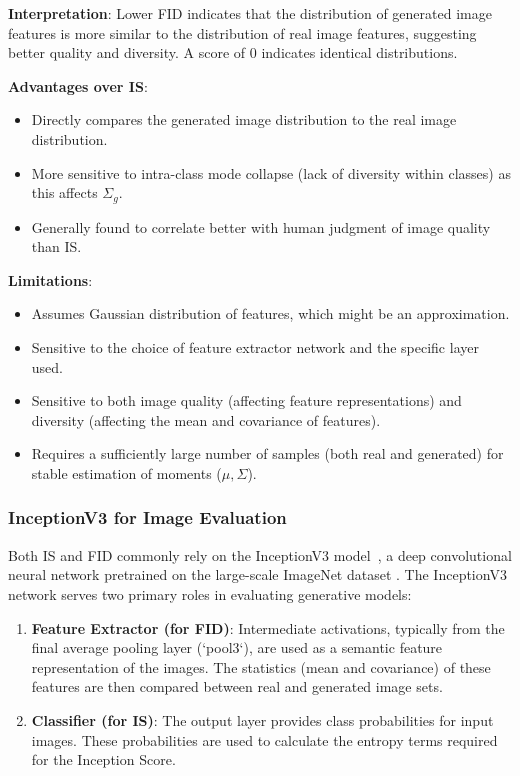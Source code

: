 \noindent\textbf{Interpretation}:
Lower FID indicates that the distribution of generated image features is more similar to the distribution of real image features, suggesting better quality and diversity. A score of 0 indicates identical distributions.

\noindent\textbf{Advantages over IS}:
\begin{itemize}
    \item Directly compares the generated image distribution to the real image distribution.
    \item More sensitive to intra-class mode collapse (lack of diversity within classes) as this affects \(\Sigma_g\).
    \item Generally found to correlate better with human judgment of image quality than IS.
\end{itemize}

\noindent\textbf{Limitations}:
\begin{itemize}
    \item Assumes Gaussian distribution of features, which might be an approximation.
    \item Sensitive to the choice of feature extractor network and the specific layer used.
    \item Sensitive to both image quality (affecting feature representations) and diversity (affecting the mean and covariance of features).
    \item Requires a sufficiently large number of samples (both real and generated) for stable estimation of moments (\(\mu, \Sigma\)).
\end{itemize}

\subsubsection[InceptionV3 Model]{InceptionV3 for Image Evaluation}

Both IS and FID commonly rely on the InceptionV3 model~\cite{szegedy2016rethinking}, a deep convolutional neural network pretrained on the large-scale ImageNet dataset \cite{ImageNetDataset5206848}. The InceptionV3 network serves two primary roles in evaluating generative models:

\begin{enumerate}
    \item \textbf{Feature Extractor (for FID)}: Intermediate activations, typically from the final average pooling layer (`pool3`), are used as a semantic feature representation of the images. The statistics (mean and covariance) of these features are then compared between real and generated image sets.
    \item \textbf{Classifier (for IS)}: The output layer provides class probabilities for input images. These probabilities are used to calculate the entropy terms required for the Inception Score.
\end{enumerate}

